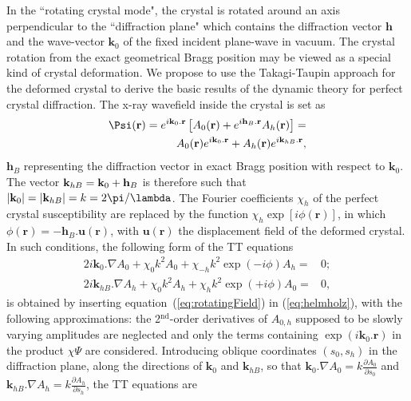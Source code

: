 \documentclass[preprint]{iucr}              %
\begin{document}
In the ``rotating crystal mode", the crystal is rotated around an axis perpendicular to the ``diffraction plane" which contains the diffraction vector $\textbf{h}$ and the wave-vector $\textbf{k}_0$ of the fixed incident plane-wave in vacuum. The crystal rotation from the exact geometrical Bragg position may be viewed as a special kind of crystal deformation. We propose to use the Takagi-Taupin approach for the deformed crystal to derive the basic results of the dynamic theory for perfect crystal diffraction. 
The x-ray wavefield inside the crystal is set as
\begin{subequations}\label{eq:rotatingField}
\label{eq:wavefieldappendix}
\begin{align}
        \Psi(\textbf r) = 
        e^{i \textbf k_0 . \textbf r} \left[
        A_0(\textbf r) + e^{i \textbf{h}_B . \textbf r} A_h(\textbf r)
        \right] = 
        \nonumber\\
        A_0(\textbf r) e^{i \textbf k_0 . \textbf r} + A_{h}(\textbf r) e^{i \textbf k_{hB} . \textbf r},
\end{align}
\end{subequations}
$\textbf{h}_B$ representing the diffraction vector in exact Bragg position with respect to $\textbf{k}_0$. The vector $\textbf k_{hB}= \textbf{k}_0 + \textbf{h}_B$  is therefore such that $|\textbf k_{0}|=|\textbf k_{hB}|=k=2 \pi / \lambda$. The Fourier coefficients $\chi_h$ of the perfect crystal susceptibility are replaced by the function $\chi_h \exp[i\phi(\textbf{r})]$, in which $\phi(\textbf{r}) = - \textbf{h}_B . \textbf{u}(\textbf{r})$, 
with $\textbf{u}(\textbf{r})$ the displacement field of the deformed crystal. In such conditions, the following form of the TT equations
\begin{subequations}
\label{eq:TTvectorappendix}
\begin{align}
2 i \textbf{k}_0 . \nabla A_0 + \chi_0 k^2 A_0 + \chi_{-h} k^2 \exp(-i\phi) A_h =& 0; \nonumber \\
2 i \textbf{k}_{hB} . \nabla A_h + \chi_0 k^2 A_h + \chi_{h} k^2 \exp(+i\phi) A_0 =& 0, \nonumber
\end{align}
\end{subequations}
is obtained by inserting equation~(\ref{eq:rotatingField}) in (\ref{eq:helmholz}), with the following approximations: the 2$^{\text{nd}}$-order derivatives of $A_{0,h}$ supposed to be slowly varying amplitudes are neglected and only the terms containing $\exp(i\textbf{k}_0.\textbf{r})$ in the product $\chi\Psi$ are considered. Introducing oblique coordinates $(s_0,s_h)$ in the diffraction plane, along the directions of $\textbf{k}_0$ and $\textbf{k}_{hB}$, so that $\textbf{k}_0.\nabla A_0=k\frac{\partial A_0}{\partial s_0}$ and  $\textbf{k}_{hB}.\nabla A_h=k\frac{\partial A_h}{\partial s_h}$, the TT equations are
\end{document}
